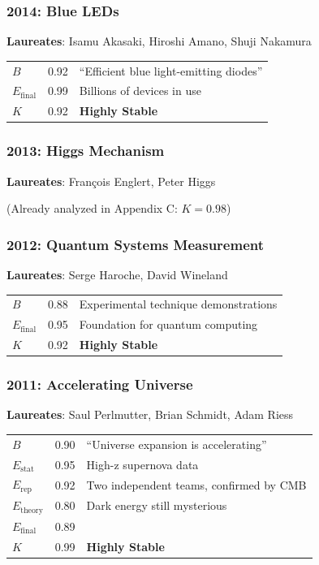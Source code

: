 \documentclass[11pt,a4paper]{article}
\begin{document}
\subsubsection{2014: Blue LEDs}
\textbf{Laureates}: Isamu Akasaki, Hiroshi Amano, Shuji Nakamura

\begin{center}
\begin{tabular}{lcl}
\toprule
$B$ & 0.92 & ``Efficient blue light-emitting diodes'' \\
$E_{\text{final}}$ & 0.99 & Billions of devices in use \\
$K$ & 0.92 & \textbf{Highly Stable} \\
\bottomrule
\end{tabular}
\end{center}

\subsubsection{2013: Higgs Mechanism}
\textbf{Laureates}: François Englert, Peter Higgs

(Already analyzed in Appendix C: $K = 0.98$)

\subsubsection{2012: Quantum Systems Measurement}
\textbf{Laureates}: Serge Haroche, David Wineland

\begin{center}
\begin{tabular}{lcl}
\toprule
$B$ & 0.88 & Experimental technique demonstrations \\
$E_{\text{final}}$ & 0.95 & Foundation for quantum computing \\
$K$ & 0.92 & \textbf{Highly Stable} \\
\bottomrule
\end{tabular}
\end{center}

\subsubsection{2011: Accelerating Universe}
\textbf{Laureates}: Saul Perlmutter, Brian Schmidt, Adam Riess

\begin{center}
\begin{tabular}{lcl}
\toprule
$B$ & 0.90 & ``Universe expansion is accelerating'' \\
$E_{\text{stat}}$ & 0.95 & High-z supernova data \\
$E_{\text{rep}}$ & 0.92 & Two independent teams, confirmed by CMB \\
$E_{\text{theory}}$ & 0.80 & Dark energy still mysterious \\
\midrule
$E_{\text{final}}$ & 0.89 & \\
$K$ & 0.99 & \textbf{Highly Stable} \\
\bottomrule
\end{tabular}
\end{center}
\end{document}
